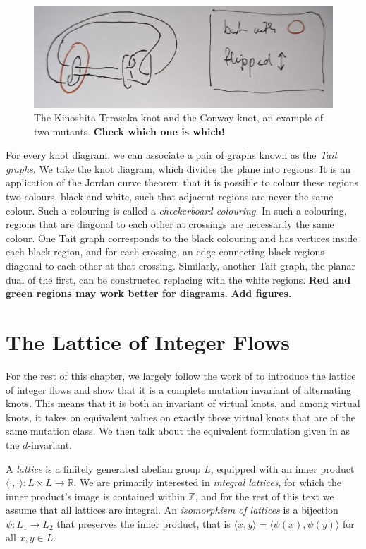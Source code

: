 \documentclass[12pt]{report}
\newcommand{\R}{\mathbb{R}}
\newcommand{\Z}{\mathbb{Z}}
\newcommand{\ip}[2]{\langle #1, #2 \rangle}
\newcommand{\notered}[1]{{\color{Red} \textbf{#1}}}
\newcommand{\notegreen}[1]{{\color{Green} \textbf{#1}}}
\begin{document}
\begin{figure}[h]
	\centering
	\includegraphics[width=0.95\linewidth]{graphics/Kinoshita_Terasaka_mutants}
	\caption{The Kinoshita-Terasaka knot and the Conway knot, an example of two mutants. \notered{Check which one is which!}}
	\label{fig:kinoshita-terasaka-mutants}
\end{figure}

For every knot diagram, we can associate a pair of graphs known as the \textit{Tait graphs}. We take the knot diagram, which divides the plane into regions. It is an application of the Jordan curve theorem that it is possible to colour these regions two colours, black and white, such that adjacent regions are never the same colour. Such a colouring is called a \textit{checkerboard colouring}. In such a colouring, regions that are diagonal to each other at crossings are necessarily the same colour. One Tait graph corresponds to the black colouring and has vertices inside each black region, and for each crossing, an edge connecting black regions diagonal to each other at that crossing. Similarly, another Tait graph, the planar dual of the first, can be constructed replacing with the white regions. \notegreen{Red and green regions may work better for diagrams.} \notered{Add figures.}


\section{The Lattice of Integer Flows}

For the rest of this chapter, we largely follow the work of \cite{lattices-graphs-mutation} to introduce the lattice of integer flows and show that it is a complete mutation invariant of alternating knots. This means that it is both an invariant of virtual knots, and among virtual knots, it takes on equivalent values on exactly those virtual knots that are of the same mutation class. We then talk about the equivalent formulation given in \cite{lattices-graphs-mutation} as the $d$-invariant.

A \textit{lattice} is a finitely generated abelian group $L$, equipped with an inner product 
\({\ip{\cdot}{\cdot}: L \times L \longrightarrow \R}\). We are primarily interested in \textit{integral lattices}, for which the inner product's image is contained within $\Z$, and for the rest of this text we assume that all lattices are integral. An \textit{isomorphism of lattices} is a bijection $\psi: L_{1} \longrightarrow L_{2}$ that preserves the inner product, that is ${\ip{x}{y} = \ip{\psi(x)}{\psi(y)}}$ for all $x, y \in L$.
\end{document}
